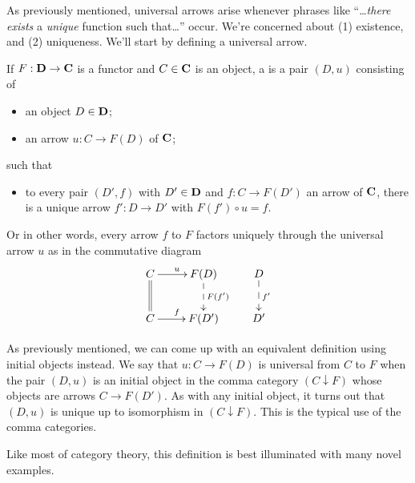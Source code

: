 
As previously mentioned, universal arrows arise whenever phrases
like ``\ldots\emph{there exists} a \emph{unique} function such
that\ldots'' occur. We're concerned about (1) existence, and (2)
uniqueness. We'll start by defining a universal arrow.

\begin{defn}%
If $F:\mathbf{D}\to\mathbf{C}$ is a functor and $C\in\mathbf{C}$ is an
object, a  is a pair
$(D,u)$ consisting of
\begin{itemize}
\item an object $D\in\mathbf{D}$;
\item an arrow $u:C\to F(D)$ of $\mathbf{C}$;
\end{itemize}
such that
\begin{itemize}
\item to every pair $(D',f)$ with $D'\in\mathbf{D}$ and $f:C\to
  F(D')$ an arrow of $\mathbf{C}$, there is a unique arrow $f':D\to
  D'$ with $F(f')\circ{}u=f$.
\end{itemize}
Or in other words, every arrow $f$ to $F$ factors uniquely
through the universal arrow $u$ as in the commutative diagram
\begin{equation}%
\vcenter{\xymatrix{
C\ar@{=}[d]\ar[r]^{u}&F(D)\ar@{-->}[d]^{F(f')}&D\ar@{-->}[d]^{f'}\\
C\ar[r]^{f}&F(D')&D'
}}
\end{equation}
\end{defn}
As previously mentioned, we can come up with an equivalent
definition using initial objects instead. We say that $u:C\to
F(D)$ is universal from $C$ to $F$ when the pair $(D,u)$ is
an initial object in the comma category $(C\downarrow{}F)$ whose
objects are arrows $C\to{} F(D')$. As with any initial object, it
turns out that $(D,u)$ is unique up to isomorphism in
$(C\downarrow{}F)$. This is the typical use of the comma
categories.

Like most of category theory, this definition is best illuminated
with many novel examples.

